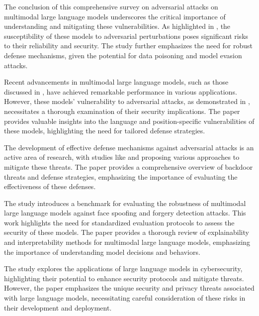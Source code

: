 \documentclass[11pt,a4paper]{article}
\begin{document}
The conclusion of this comprehensive survey on adversarial attacks on multimodal large language models underscores the critical importance of understanding and mitigating these vulnerabilities. As highlighted in \cite{doi:10.18653/v1/n19-1314}, the susceptibility of these models to adversarial perturbations poses significant risks to their reliability and security. The \cite{doi:10.18653/v1/2021.naacl-main.165} study further emphasizes the need for robust defense mechanisms, given the potential for data poisoning and model evasion attacks.

Recent advancements in multimodal large language models, such as those discussed in \cite{doi:10.1109/bigdata59044.2023.10386743}, have achieved remarkable performance in various applications. However, these models' vulnerability to adversarial attacks, as demonstrated in \cite{doi:10.18653/v1/2021.acl-long.431}, necessitates a thorough examination of their security implications. The \cite{doi:10.18653/v1/2021.acl-short.58} paper provides valuable insights into the language and position-specific vulnerabilities of these models, highlighting the need for tailored defense strategies.

The development of effective defense mechanisms against adversarial attacks is an active area of research, with studies like \cite{arxiv:2309.00614} and \cite{arxiv:2308.12833} proposing various approaches to mitigate these threats. The \cite{doi:10.53941/tai.2025.100003} paper provides a comprehensive overview of backdoor threats and defense strategies, emphasizing the importance of evaluating the effectiveness of these defenses.

The \cite{doi:10.1007/s44267-025-00079-w} study introduces a benchmark for evaluating the robustness of multimodal large language models against face spoofing and forgery detection attacks. This work highlights the need for standardized evaluation protocols to assess the security of these models. The \cite{arxiv:2412.02104} paper provides a thorough review of explainability and interpretability methods for multimodal large language models, emphasizing the importance of understanding model decisions and behaviors.

The \cite{arxiv:2402.00891} study explores the applications of large language models in cybersecurity, highlighting their potential to enhance security protocols and mitigate threats. However, the \cite{doi:10.1145/3764113} paper emphasizes the unique security and privacy threats associated with large language models, necessitating careful consideration of these risks in their development and deployment.
\end{document}
